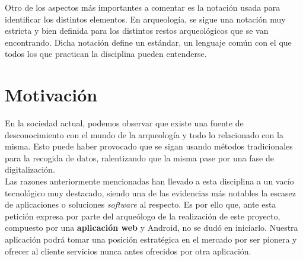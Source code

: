 Otro de los aspectos más importantes a comentar es la notación usada para identificar los
distintos elementos. En arqueología, se sigue una notación muy estricta y bien definida para
los distintos restos arqueológicos que se van encontrando. Dicha notación define un estándar,
un lenguaje común con el que todos los que practican la disciplina pueden entenderse.

\section{Motivación}
En la sociedad actual, podemos observar que existe una fuente de desconocimiento con el mundo
de la arqueología y todo lo relacionado con la misma. Esto puede haber provocado que se sigan
usando métodos tradicionales para la recogida de datos, ralentizando que la misma pase por una
fase de digitalización. \\

Las razones anteriormente mencionadas han llevado a esta disciplina a un vacío tecnológico muy
destacado, siendo una de las evidencias más notables la escasez de aplicaciones o soluciones
\textit{software} al respecto. Es por ello que, ante esta petición expresa por parte del
arqueólogo de la realización de este proyecto, compuesto por una \textbf{aplicación web} y
Android, no se dudó en iniciarlo. Nuestra aplicación podrá tomar una posición estratégica en
el mercado por ser pionera y ofrecer al cliente servicios nunca antes ofrecidos por otra
aplicación.
